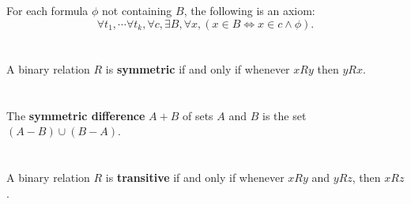 \documentclass{report}
\begin{document}
For each formula $\phi$ not containing $B$, the following is an axiom:
  $$\forall t_1, \cdots \forall t_k, \forall c,
      \exists B, \forall x, (x \in B \iff x \in c \land \phi).$$

\begin{axiom}


\end{axiom}

\section{}%

A binary relation $R$ is \textbf{symmetric} if and only if whenever $xRy$ then
  $yRx$.

\begin{definition}


\end{definition}

\section{}%

The \textbf{symmetric difference} $A + B$ of sets $A$ and $B$ is the set
  $(A - B) \cup (B - A)$.

\begin{definition}


\end{definition}

\section{}%

A binary relation $R$ is \textbf{transitive} if and only if whenever $xRy$ and
  $yRz$, then $xRz$.

\begin{definition}

  \statementpadding



\end{definition}
\end{document}
